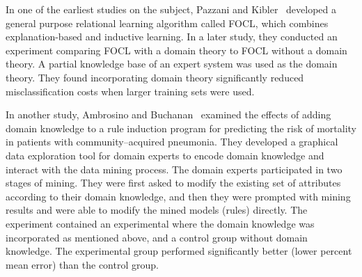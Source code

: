 
In one of the earliest studies on the subject, Pazzani and Kibler~\cite{Pazzani1992} developed a general purpose relational learning algorithm called FOCL, which combines explanation-based and inductive learning. In a later study, they conducted an experiment comparing FOCL with a domain theory to FOCL without a domain theory. A partial knowledge base of an expert system was used as the domain theory. They found incorporating domain theory significantly reduced misclassification costs when larger training sets were used.

In another study, Ambrosino and Buchanan~\cite{Ambrosino1999} examined the effects of adding domain knowledge to a rule induction program for predicting the risk of mortality in patients with community--acquired pneumonia. They developed a graphical data exploration tool for domain experts to encode domain knowledge and interact with the data mining process. The domain experts participated in two stages of mining. They were first asked to modify the existing set of attributes according to their domain knowledge, and then they were prompted with mining results and were able to modify the mined models (rules) directly. The experiment contained an experimental where the domain knowledge was incorporated as mentioned above, and a control group without domain knowledge. The experimental group performed significantly better (lower percent mean error) than the control group.

